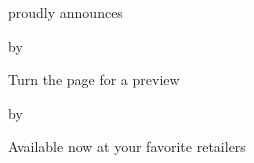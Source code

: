 \def\previewtitleblock#1#2{
  \vfill
  {\centered\booktitle{#1}\par}
  \bigskip
  \centerline{by}
  \bigskip
  \centerline{\authorname{#2}}
  \vfill
}

\def\announcing#1#2{
  \nextoddpage
  \line{}\vfill
  \centerline{\linelogo}
  \vfill
  \centerline{proudly announces}
  \previewtitleblock{#1}{#2}
  \centerline{Turn the page for a preview}
  \vfill\line{}\vfill
  \nextoddpage
}

\def\availablenow#1#2{
  \nextoddpage
  \previewtitleblock{#1}{#2}
  \centerline{Available now at your favorite retailers}
  \vfill
  \centerline{\linelogo}
  \vfill\line{}\vfill
}


\announcing{\previewtitle}{\previewauthor}

\availablenow{\previewtitle}{\previewauthor}
